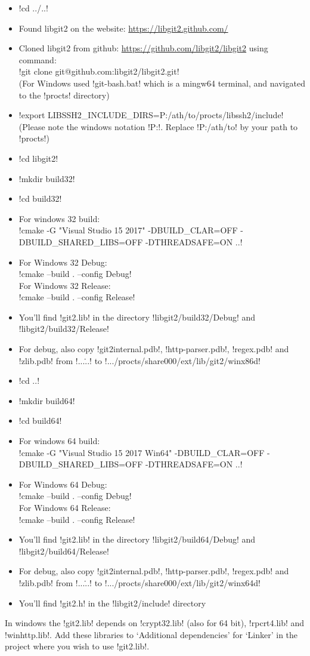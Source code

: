 \begin{itemize}
\item !cd ../..!
\item Found libgit2 on the website: \url{https://libgit2.github.com/}
\item Cloned libgit2 from github: \url{https://github.com/libgit2/libgit2}
      using command:\\
      !git clone git@github.com:libgit2/libgit2.git!\\
      (For Windows used !git-bash.bat! which is a mingw64 terminal, and navigated to the !procts! directory)
\item !export LIBSSH2_INCLUDE_DIRS=P:/ath/to/procts/libssh2/include!\\
      (Please note the windows notation !P:!. Replace !P:/ath/to! by your path to !procts!)
\item !cd libgit2!
\item !mkdir build32!
\item !cd build32!
\item For windows 32 build:\\
      !cmake -G "Visual Studio 15 2017" -DBUILD_CLAR=OFF -DBUILD_SHARED_LIBS=OFF -DTHREADSAFE=ON ..!
\item For Windows 32 Debug:\\
      !cmake --build . --config Debug!\\
      For Windows 32 Release:\\
      !cmake --build . --config Release!
\item You'll find !git2.lib! in the directory !libgit2/build32/Debug! and 
      !libgit2/build32/Release!
\item For debug, also copy !git2internal.pdb!, !http-parser.pdb!, !regex.pdb! and !zlib.pdb! from
      !...\...\Debug! to !.../procts/share000/ext/lib/git2/winx86d!
\item !cd ..!
\item !mkdir build64!
\item !cd build64!
\item For windows 64 build:\\
      !cmake -G "Visual Studio 15 2017 Win64" -DBUILD_CLAR=OFF -DBUILD_SHARED_LIBS=OFF -DTHREADSAFE=ON ..!
\item For Windows 64 Debug:\\
      !cmake --build . --config Debug!\\
      For Windows 64 Release:\\
      !cmake --build . --config Release!
\item You'll find !git2.lib! in the directory !libgit2/build64/Debug! and 
      !libgit2/build64/Release!
\item For debug, also copy !git2internal.pdb!, !http-parser.pdb!, !regex.pdb! and !zlib.pdb! from
      !...\...\Debug! to !.../procts/share000/ext/lib/git2/winx64d!
\item You'll find !git2.h! in the !libgit2/include! directory
\end{itemize}
In windows the !git2.lib! depends on !crypt32.lib! (also for 64 bit), 
!rpcrt4.lib! and !winhttp.lib!.
Add these libraries to `Additional dependencies' for `Linker' in the project
where you wish to use !git2.lib!.


